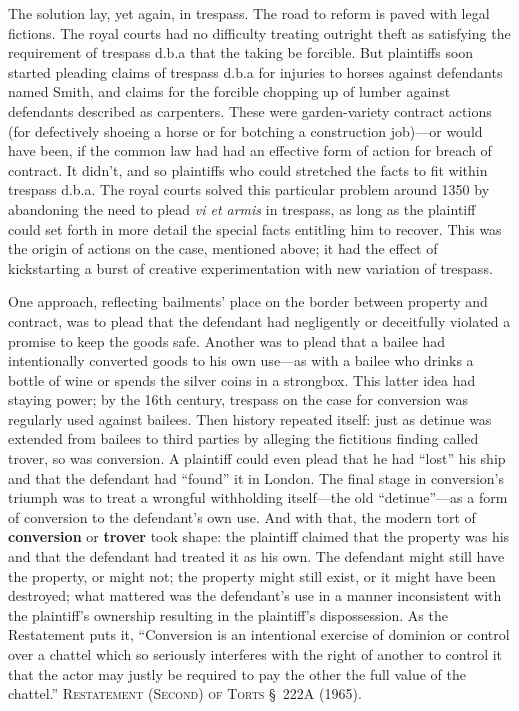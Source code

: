 The solution lay, yet again, in trespass. The road to reform is paved with legal
fictions. The royal courts had no difficulty treating outright theft as
satisfying the requirement of trespass d.b.a that the taking be forcible. But
plaintiffs soon started pleading claims of trespass d.b.a for injuries to
horses against defendants named Smith, and claims for the forcible chopping up
of lumber against defendants described as carpenters. These were garden-variety
contract actions (for defectively shoeing a horse or for botching a
construction job)---or would have been, if the common law had had an effective
form of action for breach of contract. It didn't, and so plaintiffs who could
stretched the facts to fit within trespass d.b.a. The royal courts solved this
particular problem around 1350 by abandoning the need to plead \textit{vi et
armis} in trespass, as long as the plaintiff could set forth in more detail the
special facts entitling him to recover. This was the origin of actions on the
case, mentioned above; it had the effect of kickstarting a burst of creative
experimentation with new variation of trespass.

One approach, reflecting bailments' place on the border between property and
contract, was to plead that the defendant had negligently or deceitfully
violated a promise to keep the goods safe. Another was to plead that a bailee
had intentionally converted goods to his own use---as with a bailee who drinks
a bottle of wine or spends the silver coins in a strongbox. This latter idea
had staying power; by the 16th century, trespass on the case for conversion was
regularly used against bailees. Then history repeated itself: just as detinue
was extended from bailees to third parties by alleging the fictitious finding
called trover, so was conversion. A plaintiff could even plead that he had
``lost'' his ship and that the defendant had ``found'' it in London. The final
stage in conversion's triumph was to treat a wrongful withholding itself---the
old ``detinue''---as a form of conversion to the defendant's own use. And with
that, the modern tort of \textbf{conversion} or \textbf{trover} took shape: the
plaintiff claimed that the property was his and that the defendant had treated
it as his own. The defendant might still have the property, or might not; the
property might still exist, or it might have been destroyed; what mattered was
the defendant's use in a manner inconsistent with the plaintiff's ownership
resulting in the plaintiff's dispossession. As the Restatement puts it,
``Conversion is an intentional exercise of dominion or control over a chattel
which so seriously interferes with the right of another to control it that the
actor may justly be required to pay the other the full value of the chattel.''
\textsc{Restatement (Second) of Torts} \S~222A (1965).


